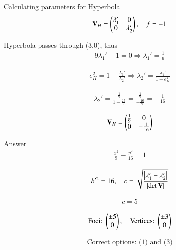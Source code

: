 \documentclass{beamer}
\begin{document}
\begin{frame}{Calculating parameters for Hyperbola}
\begin{align}
\mathbf{V}_H = \begin{pmatrix}\lambda_1' & 0 \\ 0 & \lambda_2'\end{pmatrix}, \quad f = -1
\end{align}

Hyperbola passes through  (3,0), thus
\begin{align}
9\lambda_1' - 1 = 0 \Rightarrow \lambda_1' = \frac{1}{9}
\end{align}

\begin{align}
e_H^2 = 1 - \frac{\lambda_1'}{\lambda_2'} \Rightarrow \lambda_2' = \frac{\lambda_1'}{1 - e_H^2}
\end{align}

\begin{align}
\lambda_2' = \frac{\frac{1}{9}}{1 - \frac{25}{9}} = \frac{\frac{1}{9}}{-\frac{16}{9}} = -\frac{1}{16}
\end{align}

\begin{align}
\mathbf{V}_H = \begin{pmatrix}\frac{1}{9} & 0 \\ 0 & -\frac{1}{16}\end{pmatrix}
\end{align}
\end{frame}

\begin{frame}{Answer}
\begin{align}
\frac{x^2}{9} - \frac{y^2}{16} = 1
\end{align}

\begin{align}
b'^2 = 16, \quad 
c = \sqrt{\frac{\left\vert\lambda_1' - \lambda_2'\right\vert}{\left\vert\det{\mathbf{V}}\right\vert}}
\end{align}

\begin{align}
c = 5
\end{align}

\begin{align}
\text{Foci: } \begin{pmatrix}\pm5 \\ 0\end{pmatrix}, \quad \text{Vertices: } \begin{pmatrix}\pm3 \\ 0\end{pmatrix}
\end{align}

\begin{align}
\boxed{\text{Correct options: (1) and (3)}}
\end{align}
\end{frame}
\end{document}
